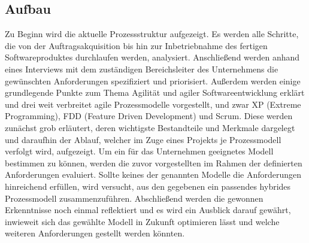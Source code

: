 \subsection{Aufbau}
Zu Beginn wird die aktuelle Prozessstruktur aufgezeigt. Es werden alle Schritte, die von der Auftragsakquisition bis hin zur Inbetriebnahme des fertigen Softwareproduktes durchlaufen werden, analysiert. Anschließend werden anhand eines Interviews mit dem zuständigen Bereichsleiter des Unternehmens die gewünschten Anforderungen spezifiziert und priorisiert. Außerdem werden einige grundlegende Punkte zum Thema Agilität und agiler Softwareentwicklung erklärt und drei weit verbreitet agile Prozessmodelle vorgestellt, und zwar XP (Extreme Programming), FDD (Feature Driven Development) und Scrum. Diese werden zunächst grob erläutert, deren wichtigste Bestandteile und Merkmale dargelegt und daraufhin der Ablauf, welcher im Zuge eines Projekts je Prozessmodell verfolgt wird, aufgezeigt. Um ein für das Unternehmen geeignetes Modell bestimmen zu können, werden die zuvor vorgestellten im Rahmen der definierten Anforderungen evaluiert. Sollte keines der genannten Modelle die Anforderungen hinreichend erfüllen, wird versucht, aus den gegebenen ein passendes hybrides Prozessmodell zusammenzuführen. Abschließend werden die gewonnen Erkenntnisse noch einmal reflektiert und es wird ein Ausblick darauf gewährt, inwieweit sich das gewählte Modell in Zukunft optimieren lässt und welche weiteren Anforderungen gestellt werden könnten.